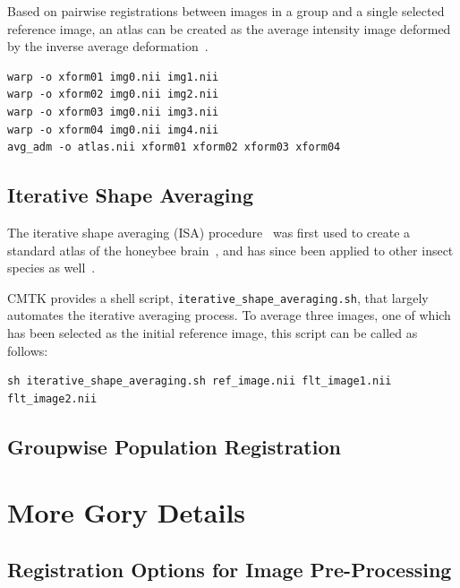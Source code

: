 \documentclass{InsightArticle}
\begin{document}
Based on pairwise registrations between images in a group and a single selected
reference image, an atlas can be created as the average intensity image
deformed by the inverse average deformation~\cite{GuimMeunThir:2000}.

\cite{JeffPottChan:2007}

\cite{FranRuecSchn:2001,FranRuecSchn:2002}

\begin{verbatim}
warp -o xform01 img0.nii img1.nii
warp -o xform02 img0.nii img2.nii
warp -o xform03 img0.nii img3.nii
warp -o xform04 img0.nii img4.nii
avg_adm -o atlas.nii xform01 xform02 xform03 xform04
\end{verbatim}

\subsection{Iterative Shape Averaging}

The iterative shape averaging (ISA) procedure~\cite{RohlBranMaur:2001} was
first used to create a standard atlas of the honeybee
brain~\cite{BranRohlRyba:2005}, and has since been applied to other insect
species as well~\cite{KuryRohlKrof:2008,KvelLofaRyba:2009}.

CMTK provides a shell script, {\tt iterative\_shape\_averaging.sh}, that
largely automates the iterative averaging process. To average three images,
one of which has been selected as the initial reference image, this script can
be called as follows:
\begin{verbatim}
sh iterative_shape_averaging.sh ref_image.nii flt_image1.nii flt_image2.nii
\end{verbatim}

\subsection{Groupwise Population Registration}


\cite{Learned-Miller:2006}
\cite{BalcGollShen:2007}
\cite{RohlZahrSull:2008,RohlZahrSull:2010}

\clearpage
\section{More Gory Details}

\subsection{Registration Options for Image Pre-Processing}
\end{document}
